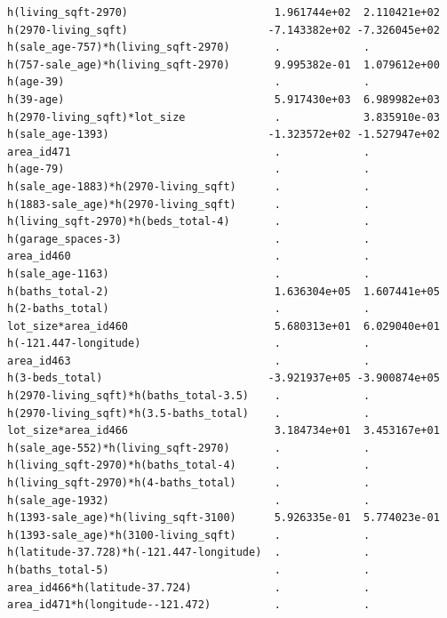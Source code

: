 \documentclass[
]{article}
\begin{document}
\begin{verbatim}
h(living_sqft-2970)                       1.961744e+02  2.110421e+02
h(2970-living_sqft)                      -7.143382e+02 -7.326045e+02
h(sale_age-757)*h(living_sqft-2970)       .             .           
h(757-sale_age)*h(living_sqft-2970)       9.995382e-01  1.079612e+00
h(age-39)                                 .             .           
h(39-age)                                 5.917430e+03  6.989982e+03
h(2970-living_sqft)*lot_size              .             3.835910e-03
h(sale_age-1393)                         -1.323572e+02 -1.527947e+02
area_id471                                .             .           
h(age-79)                                 .             .           
h(sale_age-1883)*h(2970-living_sqft)      .             .           
h(1883-sale_age)*h(2970-living_sqft)      .             .           
h(living_sqft-2970)*h(beds_total-4)       .             .           
h(garage_spaces-3)                        .             .           
area_id460                                .             .           
h(sale_age-1163)                          .             .           
h(baths_total-2)                          1.636304e+05  1.607441e+05
h(2-baths_total)                          .             .           
lot_size*area_id460                       5.680313e+01  6.029040e+01
h(-121.447-longitude)                     .             .           
area_id463                                .             .           
h(3-beds_total)                          -3.921937e+05 -3.900874e+05
h(2970-living_sqft)*h(baths_total-3.5)    .             .           
h(2970-living_sqft)*h(3.5-baths_total)    .             .           
lot_size*area_id466                       3.184734e+01  3.453167e+01
h(sale_age-552)*h(living_sqft-2970)       .             .           
h(living_sqft-2970)*h(baths_total-4)      .             .           
h(living_sqft-2970)*h(4-baths_total)      .             .           
h(sale_age-1932)                          .             .           
h(1393-sale_age)*h(living_sqft-3100)      5.926335e-01  5.774023e-01
h(1393-sale_age)*h(3100-living_sqft)      .             .           
h(latitude-37.728)*h(-121.447-longitude)  .             .           
h(baths_total-5)                          .             .           
area_id466*h(latitude-37.724)             .             .           
area_id471*h(longitude--121.472)          .             .           
                                                                    

\end{verbatim}
\end{document}
